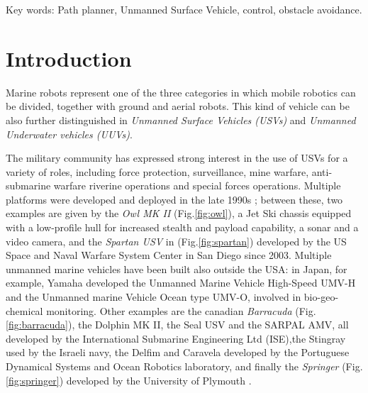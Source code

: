 \documentclass[12pt]{article}
\begin{document}
Key words: Path planner, Unmanned Surface Vehicle, control, obstacle avoidance.

%



\section{Introduction} \label{introduction}

      Marine robots represent one of the three categories in which mobile robotics can be divided, together with ground and aerial robots. This kind of vehicle can be also further distinguished in \textit{Unmanned Surface Vehicles (USVs)} and \textit{Unmanned Underwater vehicles (UUVs)}.

      \indent The military community has expressed strong interest in the use of USVs for a variety of roles, including force protection, surveillance, mine warfare, anti-submarine warfare riverine operations and special forces operations. Multiple platforms were developed and deployed in the late 1990s  \parencite{Bertram2008}; between these, two examples are given by the \textit{Owl MK II} (Fig.\ref{fig:owl}), a Jet Ski chassis equipped with a low-profile hull for increased stealth and payload capability, a sonar and a video camera, and the \textit{Spartan USV} in (Fig.\ref{fig:spartan}) developed by the US Space and Naval Warfare System Center in San Diego since 2003. Multiple unmanned marine vehicles have been built also outside the USA: in Japan, for example, Yamaha developed the Unmanned Marine Vehicle High-Speed UMV-H and the Unmanned marine Vehicle Ocean type UMV-O, involved in bio-geo-chemical monitoring. Other examples are the canadian \textit{Barracuda} (Fig.\ref{fig:barracuda}), the Dolphin MK II, the Seal USV and the SARPAL AMV, all developed by the International Submarine Engineering Ltd (ISE),the Stingray used by the Israeli navy, the Delfim and Caravela developed by the Portuguese Dynamical Systems and Ocean Robotics laboratory, and finally the \textit{Springer} (Fig.\ref{fig:springer}) developed by the University of Plymouth \parencite{Naeem2009} .
\end{document}
